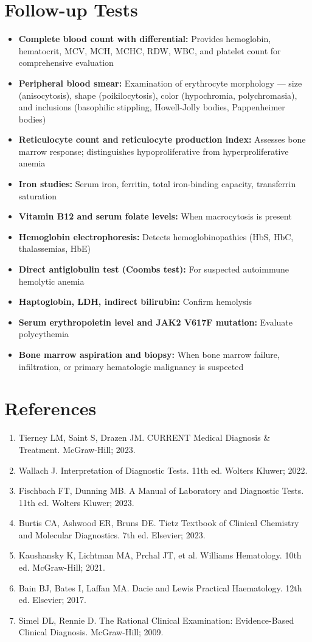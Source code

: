 \section*{Follow-up Tests}
\begin{itemize}
  \item \textbf{Complete blood count with differential:} Provides hemoglobin, hematocrit, MCV, MCH, MCHC, RDW, WBC, and platelet count for comprehensive evaluation
  \item \textbf{Peripheral blood smear:} Examination of erythrocyte morphology --- size (anisocytosis), shape (poikilocytosis), color (hypochromia, polychromasia), and inclusions (basophilic stippling, Howell-Jolly bodies, Pappenheimer bodies)
  \item \textbf{Reticulocyte count and reticulocyte production index:} Assesses bone marrow response; distinguishes hypoproliferative from hyperproliferative anemia
  \item \textbf{Iron studies:} Serum iron, ferritin, total iron-binding capacity, transferrin saturation
  \item \textbf{Vitamin B12 and serum folate levels:} When macrocytosis is present
  \item \textbf{Hemoglobin electrophoresis:} Detects hemoglobinopathies (HbS, HbC, thalassemias, HbE)
  \item \textbf{Direct antiglobulin test (Coombs test):} For suspected autoimmune hemolytic anemia
  \item \textbf{Haptoglobin, LDH, indirect bilirubin:} Confirm hemolysis
  \item \textbf{Serum erythropoietin level and JAK2 V617F mutation:} Evaluate polycythemia
  \item \textbf{Bone marrow aspiration and biopsy:} When bone marrow failure, infiltration, or primary hematologic malignancy is suspected
\end{itemize}

\section*{References}
\begin{enumerate}
  \item Tierney LM, Saint S, Drazen JM. CURRENT Medical Diagnosis \& Treatment. McGraw-Hill; 2023.
  \item Wallach J. Interpretation of Diagnostic Tests. 11th ed. Wolters Kluwer; 2022.
  \item Fischbach FT, Dunning MB. A Manual of Laboratory and Diagnostic Tests. 11th ed. Wolters Kluwer; 2023.
  \item Burtis CA, Ashwood ER, Bruns DE. Tietz Textbook of Clinical Chemistry and Molecular Diagnostics. 7th ed. Elsevier; 2023.
  \item Kaushansky K, Lichtman MA, Prchal JT, et al. Williams Hematology. 10th ed. McGraw-Hill; 2021.
  \item Bain BJ, Bates I, Laffan MA. Dacie and Lewis Practical Haematology. 12th ed. Elsevier; 2017.
  \item Simel DL, Rennie D. The Rational Clinical Examination: Evidence-Based Clinical Diagnosis. McGraw-Hill; 2009.
\end{enumerate}

\clearpage
